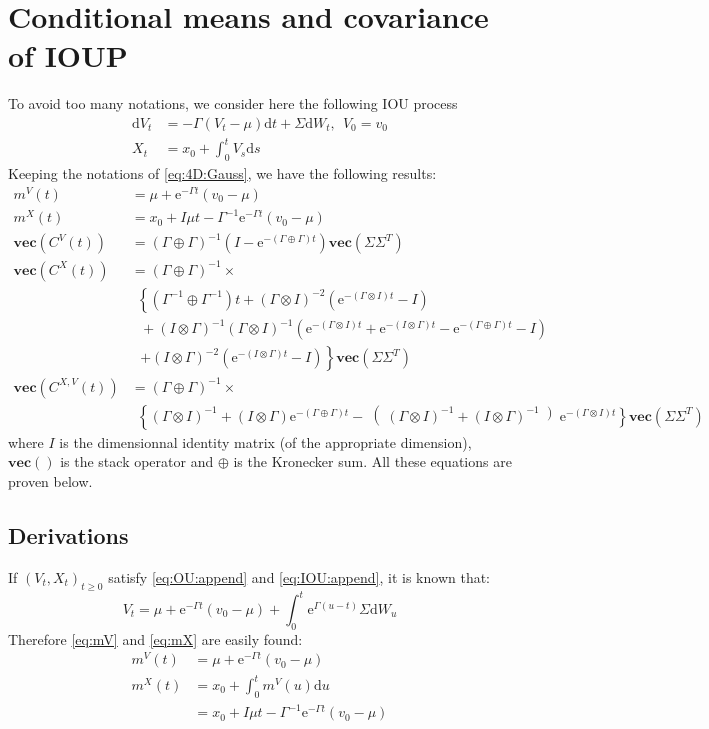 \documentclass[10pt,a4paper]{article}
\newcommand{\rmd}{\text{d}}
\newcommand{\e}{\text{e}}
\newcommand{\inv}{^{-1}}
\newcommand{\GoI}{\left(\Gamma \otimes I \right)}
\newcommand{\IoG}{\left(I \otimes \Gamma \right)}
\newcommand{\GpG}{\left( \Gamma \oplus \Gamma \right)}
\newcommand{\Vect}[1]{\textbf{vec}\left(#1 \right)}
\begin{document}
\section{Conditional means and covariance of IOUP}
\label{sec:MeanCov}
To avoid too many notations, we consider here the following IOU process
\begin{align}
\rmd V_t &= -\Gamma \left( V_t - \mu \right)\rmd t + \Sigma \rmd W_t,~~V_0 = v_0\label{eq:OU:append}\\
X_t &= x_0 + \int_0^t V_s \rmd s\label{eq:IOU:append}
\end{align}
Keeping the notations of \eqref{eq:4D:Gauss}, we have the following results:
\begin{align}
m^V(t) &= \mu + \e^{-\Gamma t} ( v_0 - \mu)\label{eq:mV}\\
m^X(t) &= x_0 + I\mu t - \Gamma\inv\e^{-\Gamma t} ( v_0 - \mu)\label{eq:mX}\\
\Vect{C^V (t)} &= \GpG\inv \left(I - \e^{-(\Gamma  \oplus \Gamma) t} \right) \Vect{\Sigma \Sigma^T} \label{eq:CX}\\
\Vect{C^X(t)} &= \GpG\inv \times \nonumber\\
&~~\left\lbrace   \left(\Gamma\inv \oplus \Gamma\inv \right)t + \GoI^{-2}\left(\e^{-\GoI t}  - I \right)\right. \nonumber\\
&~~~ + \IoG\inv\GoI\inv\left(\e^{-\GoI t} + \e^{-\IoG t} - \e^{-\GpG t} - I \right)\nonumber \\
&~~~\left. + \IoG^{-2} \left(\e^{-\IoG t}  - I \right)\right\rbrace\Vect{\Sigma\Sigma^T}\label{eq:CV}\\
\Vect{C^{X,V}(t)}&= \GpG\inv\times \nonumber\\ 
&~~ \left\lbrace \GoI\inv + \IoG \e^{- \GpG t} - \right( \GoI\inv + \IoG\inv \left)\e^{-\GoI t}\right\rbrace \Vect{\Sigma\Sigma^T}\label{eq:CVX}
\end{align}
where $I$ is the dimensionnal identity matrix (of the appropriate dimension), $\Vect{}$ is the stack operator and $\oplus$ is the Kronecker sum. All these equations are proven below.
\subsection{Derivations}
If $(V_t, X_t)_{t\geq 0}$ satisfy \eqref{eq:OU:append} and \eqref{eq:IOU:append}, it is known that:
$$V_t = \mu + \e^{-\Gamma t}(v_0 - \mu) + \int^t_0 \e^{\Gamma (u-t)}\Sigma \rmd W_u$$
Therefore \eqref{eq:mV} and \eqref{eq:mX} are easily found:
\begin{align*}
m^V(t) &= \mu + \e^{-\Gamma t}(v_0 - \mu)\\
m^X(t) &= x_0 + \int_0^tm^V(u)\rmd u\\
&= x_0 + I\mu t - \Gamma\inv \e^{-\Gamma t}( v_0 - \mu)
\end{align*}
\end{document}
